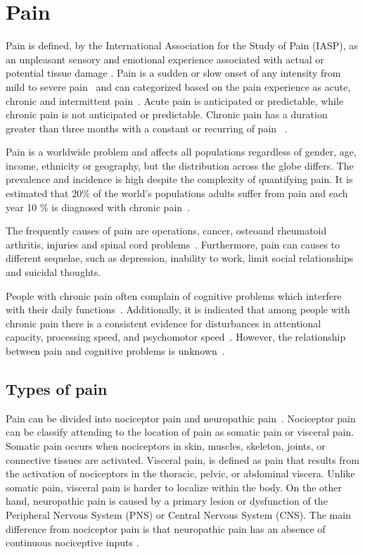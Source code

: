 \section{Pain}
Pain is defined, by the International Association for the Study of Pain (IASP), as an unpleasant sensory and emotional experience associated with actual or potential tissue damage \cite{(Marsky and Bogduk, 1994}. Pain is a sudden or slow onset of any intensity from mild to severe pain~\cite{Mello2016} and can categorized based on the pain experience as acute, chronic and intermittent pain~\cite{Goldberg2011}. Acute pain is anticipated or predictable, while  chronic pain is not anticipated or predictable. Chronic pain has a duration greater than three months with a constant or recurring of pain ~\cite{Mello2016}. 

Pain is a worldwide problem and affects all populations regardless of gender, age, income, ethnicity or geography, but the distribution across the globe differs\cite{Goldberg2011}. 
The prevalence and incidence is high despite the complexity of quantifying pain\cite{Goldberg2011}. It is estimated that 20\% of the world's populations adults suffer from pain and each year 10 \% is diagnosed with chronic pain~\cite{Goldberg2011}. 

The frequently causes of pain are operations, cancer, osteoand rheumatoid arthritis, injuries and spinal cord problems~\cite{Goldberg2011}. Furthermore, pain can causes to different sequelae, such as depression, inability to work, limit social relationships and suicidal thoughts\cite{Goldberg2011}. 

People with chronic pain often complain of cognitive problems which interfere with their daily functions~\cite{Geisser2018}. Additionally, it is indicated that among people with chronic pain there is a consistent evidence for disturbances in attentional capacity, processing speed, and psychomotor speed~\cite{Geisser2018}. However, the relationship between pain and cognitive problems is unknown~\cite{Geisser2018}. 

\subsection{Types of pain}
Pain can be divided into nociceptor pain and neuropathic pain~\cite{Steeds2013}. Nociceptor pain can be classify attending to the location of pain as somatic pain or visceral pain. Somatic pain occurs when nociceptors in skin, muscles, skeleton, joints, or connective tissues are activated. Visceral pain, is defined as pain that results from the activation of nociceptors in the thoracic, pelvic, or abdominal viscera. Unlike somatic pain, visceral pain is harder to localize within the body.  On the other hand, neuropathic pain is caused by a primary lesion or dysfunction of the Peripheral Nervous System (PNS) or Central Nervous System (CNS). The main difference from nociceptor pain is that neuropathic pain has an absence of continuous nociceptive inputs \cite{neuropathic pain}. 



